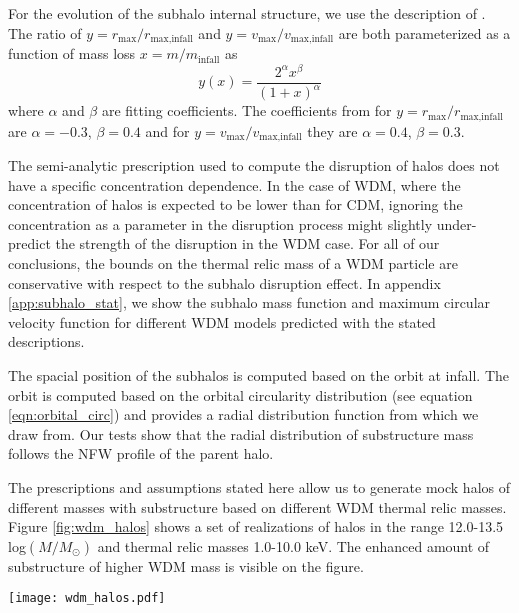 \documentclass[a4paper,11pt]{article}
\begin{document}
For the evolution of the subhalo internal structure, we use the description of \cite{Penarrubia:2008p14342, Penarrubia:2010p14353}. The ratio of $y=r_{\text{max}}/r_{\text{max,infall}}$ and $y=v_{\text{max}}/v_{\text{max,infall}}$ are both parameterized as a function of mass loss $x=m/m_{\text{infall}}$ as
\begin{equation}
	y(x) = \frac{2^{\alpha}x^{\beta}}{(1+x)^{\alpha}}
\end{equation}
where $\alpha$ and $\beta$ are fitting coefficients. The coefficients from \cite{Penarrubia:2008p14342, Penarrubia:2010p14353} for $y=r_{\text{max}}/r_{\text{max,infall}}$ are $\alpha=-0.3$, $\beta=0.4$ and for $y=v_{\text{max}}/v_{\text{max,infall}}$ they are $\alpha=0.4$, $\beta=0.3$.


The semi-analytic prescription used to compute the disruption of halos does not have a specific concentration dependence. In the case of WDM, where the concentration of halos is expected to be lower than for CDM, ignoring the concentration as a parameter in the disruption process might slightly under-predict the strength of the disruption in the WDM case. For all of our conclusions, the bounds on the thermal relic mass of a WDM particle are conservative with respect to the subhalo disruption effect. In appendix \ref{app:subhalo_stat}, we show the subhalo mass function and maximum circular velocity function for different WDM models predicted with the stated descriptions.

The spacial position of the subhalos is computed based on the orbit at infall. The orbit is computed based on the orbital circularity distribution (see equation \ref{eqn:orbital_circ}) and provides a radial distribution function from which we draw from. Our tests show that the radial distribution of substructure mass follows the NFW profile of the parent halo.

The prescriptions and assumptions stated here allow us to generate mock halos of different masses with substructure based on different WDM thermal relic masses. Figure \ref{fig:wdm_halos} shows a set of realizations of halos in the range 12.0-13.5 log$(M/M_{\odot})$ and thermal relic masses 1.0-10.0 keV. The enhanced amount of substructure of higher WDM mass is visible on the figure.


\begin{figure*}
  \centering
  \texttt{[image: wdm\_halos.pdf]}
  \caption{The projected mass of a set of different stochastic semi-analytic substructure realizations. From left to right: Increasing dark matter thermal relic mass from 1 keV to 10 keV. From top to bottom: Increasing parent halo mass from $10^{12}M_{\odot}$-$10^{13.5}M_{\odot}$. The size of the region is identical to the HST image being modeled, i.e. 4" by 4". The color scale is fixed for different dark matter models but change with halo mass.}
  \label{fig:wdm_halos}
\end{figure*}
\end{document}
